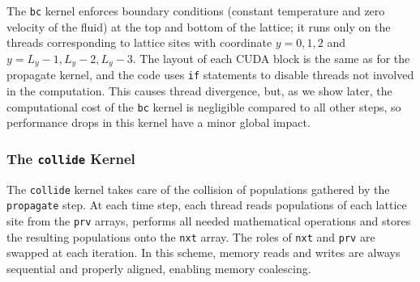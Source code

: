 \documentclass{elsarticle}
\begin{document}
The {\tt bc} kernel enforces boundary conditions (constant temperature 
and zero velocity of the fluid) at the top and bottom of 
the lattice; it runs only on the 
threads corresponding to lattice sites with coordinate {$y=0, 1, 2$} and 
{$y=L_y-1, L_y-2, L_y-3$}.
%
The layout of each CUDA block is the same as for the propagate 
kernel, and the code uses {\tt if} statements to disable threads not involved in the 
computation. This causes thread divergence, but, as we show later, 
the computational cost of the {\tt bc} kernel is negligible compared to all 
other steps, so performance drops in this kernel have a minor global impact.

\subsubsection*{The {\tt collide} Kernel}

The {\tt collide} kernel takes care of the collision of populations gathered 
by the {\tt propagate} step. At each time step, each thread reads populations of each lattice site from the {\tt prv} arrays, performs all needed mathematical 
operations and stores the resulting populations onto the {\tt nxt} array.
%
The roles of {\tt nxt} and {\tt prv} are swapped at each iteration.
In this scheme,  memory reads and writes are always sequential 
and properly aligned, enabling memory coalescing.
\end{document}
